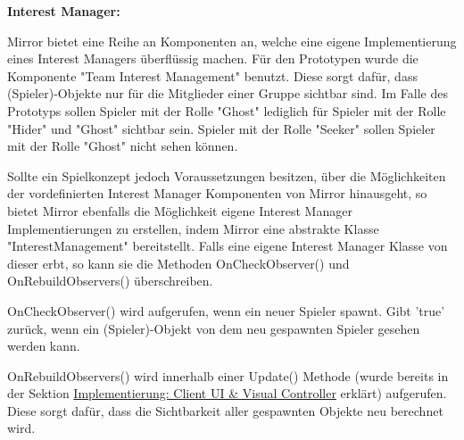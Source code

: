 \textbf{Interest Manager:}

Mirror bietet eine Reihe an Komponenten an, welche eine eigene Implementierung eines Interest Managers überflüssig machen.\cite{.17.02.2022} Für den Prototypen wurde die Komponente "Team Interest Management" \cite{.17.02.2022b} benutzt. Diese sorgt dafür, dass (Spieler)-Objekte nur für die Mitglieder einer Gruppe sichtbar sind. Im Falle des Prototyps sollen Spieler mit der Rolle "Ghost" lediglich für Spieler mit der Rolle "Hider" und "Ghost" sichtbar sein. Spieler mit der Rolle "Seeker" sollen Spieler mit der Rolle "Ghost" nicht sehen können.

Sollte ein Spielkonzept jedoch Voraussetzungen besitzen, über die Möglichkeiten der vordefinierten Interest Manager Komponenten von Mirror hinausgeht, so bietet Mirror ebenfalls die Möglichkeit eigene Interest Manager Implementierungen zu erstellen, indem Mirror eine abstrakte Klasse "InterestManagement" bereitstellt. Falls eine eigene Interest Manager Klasse von dieser erbt, so kann sie die Methoden OnCheckObserver() und OnRebuildObservers() überschreiben.

OnCheckObserver() wird aufgerufen, wenn ein neuer Spieler spawnt. Gibt 'true' zurück, wenn ein (Spieler)-Objekt von dem neu gespawnten Spieler gesehen werden kann.

OnRebuildObservers() wird innerhalb einer Update() Methode (wurde bereits in der Sektion \hyperref[implementierung:client_UI_Controller]{Implementierung: Client UI \& Visual Controller} erklärt) aufgerufen. Diese sorgt dafür, dass die Sichtbarkeit aller gespawnten Objekte neu berechnet wird.





